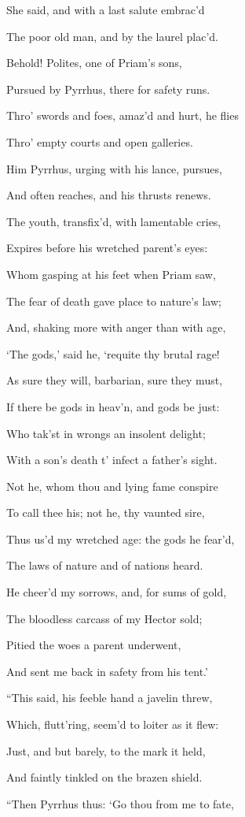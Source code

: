 She said, and with a last salute embrac’d

The poor old man, and by the laurel plac’d.

Behold! Polites, one of Priam’s sons,

Pursued by Pyrrhus, there for safety runs.

Thro’ swords and foes, amaz’d and hurt, he flies

Thro’ empty courts and open galleries.

Him Pyrrhus, urging with his lance, pursues,

And often reaches, and his thrusts renews.

The youth, transfix’d, with lamentable cries,

Expires before his wretched parent’s eyes:

Whom gasping at his feet when Priam saw,

The fear of death gave place to nature’s law;

And, shaking more with anger than with age,

‘The gods,’ said he, ‘requite thy brutal rage!

As sure they will, barbarian, sure they must,

If there be gods in heav’n, and gods be just:

Who tak’st in wrongs an insolent delight;

With a son’s death t’ infect a father’s sight.

Not he, whom thou and lying fame conspire

To call thee his; not he, thy vaunted sire,

Thus us’d my wretched age: the gods he fear’d,

The laws of nature and of nations heard.

He cheer’d my sorrows, and, for sums of gold,

The bloodless carcass of my Hector sold;

Pitied the woes a parent underwent,

And sent me back in safety from his tent.’

“This said, his feeble hand a javelin threw,

Which, flutt’ring, seem’d to loiter as it flew:

Just, and but barely, to the mark it held,

And faintly tinkled on the brazen shield.

“Then Pyrrhus thus: ‘Go thou from me to fate,

